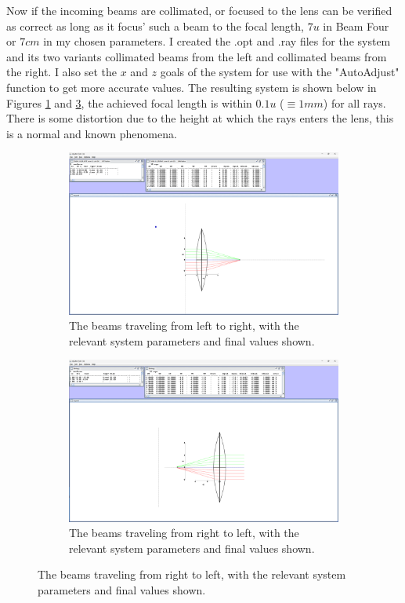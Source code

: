\documentclass[colorlinks,11pt,a4paper,normalphoto,withhyper,ragged2e]{altareport}
\begin{document}
		Now if the incoming beams are collimated, or focused to the lens can be verified as correct as long as it focus' such a beam to the focal length, $7u$ in Beam Four or $7cm$ in my chosen parameters. I created the .opt and .ray files for the system and its two variants collimated beams from the left and collimated beams from the right. I also set the $x$ and $z$ goals of the system for use with the "AutoAdjust" function to get more accurate values. \linebreak
		The resulting system is shown below in Figures \ref{fig:t1_l2r} and \ref{fig:t2_r2l}, the achieved focal length is within $0.1u$ ($ \equiv 1mm$) for all rays. There is some distortion due to the height at which the rays enters the lens, this is a normal and known phenomena. \linebreak
		
		
		\begin{figure}[h]
			\centering
			\begin{subfigure}{0.47\linewidth}
				\centering
				\includegraphics[width=\linewidth]{Images/T1-L2R-Full-Window.png}
				\caption{\centering\footnotesize The beams traveling from left to right, with the relevant system parameters and final values shown.}
				\label{fig:t1_l2r}
			\end{subfigure}
			\hfill
			\begin{subfigure}{0.47\linewidth}
				\centering
				\includegraphics[width=\linewidth]{Images/T1-R2L-Full-Window.png}
				\caption{\centering\footnotesize The beams traveling from right to left, with the relevant system parameters and final values shown.}
				\label{fig:t2_r2l}
			\end{subfigure}
		\end{figure}
		
\end{document}
